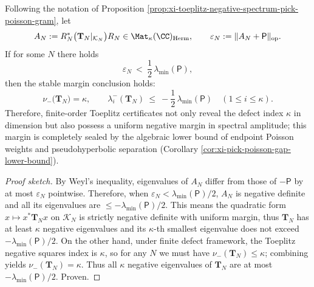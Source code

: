 \begin{proposition}\label{prop:xi-toeplitz-negative-spectrum-margin-threshold}
Following the notation of Proposition \ref{prop:xi-toeplitz-negative-spectrum-pick-poisson-gram}, let
\[
A_N:=R_N^\ast\bigl(\mathbf{T}_N|_{\mathcal K_N}\bigr)R_N\in\Mat_{\kappa}(\CC)_{\mathrm{Herm}},
\qquad
\varepsilon_N:=\|A_N+\mathsf P\|_{\mathrm{op}}.
\]
If for some \(N\) there holds
\[
\varepsilon_N\ <\ \frac12\,\lambda_{\min}(\mathsf P),
\]
then the stable margin conclusion holds:
\[
\boxed{\;
\nu_-\!\bigl(\mathbf{T}_N\bigr)=\kappa,
\qquad
\lambda_i^{-}(\mathbf{T}_N)\ \le\ -\frac12\,\lambda_{\min}(\mathsf P)\quad(1\le i\le \kappa).\;}
\]
Therefore, finite-order Toeplitz certificates not only reveal the defect index \(\kappa\) in dimension but also possess a uniform negative margin in spectral amplitude; this margin is completely sealed by the algebraic lower bound of endpoint Poisson weights and pseudohyperbolic separation (Corollary \ref{cor:xi-pick-poisson-gap-lower-bound}).
\end{proposition}
\begin{proof}[Proof sketch]
By Weyl's inequality, eigenvalues of \(A_N\) differ from those of \(-\mathsf P\) by at most \(\varepsilon_N\) pointwise.
Therefore, when \(\varepsilon_N<\lambda_{\min}(\mathsf P)/2\), \(A_N\) is negative definite and all its eigenvalues are \(\le-\lambda_{\min}(\mathsf P)/2\).
This means the quadratic form \(x\mapsto x^\ast\mathbf{T}_N x\) on \(\mathcal K_N\) is strictly negative definite with uniform margin, thus \(\mathbf{T}_N\) has at least \(\kappa\) negative eigenvalues and its \(\kappa\)-th smallest eigenvalue does not exceed \(-\lambda_{\min}(\mathsf P)/2\).
On the other hand, under finite defect framework, the Toeplitz negative squares index is \(\kappa\), so for any \(N\) we must have \(\nu_-(\mathbf{T}_N)\le \kappa\); combining yields \(\nu_-(\mathbf{T}_N)=\kappa\).
Thus all \(\kappa\) negative eigenvalues of \(\mathbf{T}_N\) are at most \(-\lambda_{\min}(\mathsf P)/2\). Proven.
\end{proof}

